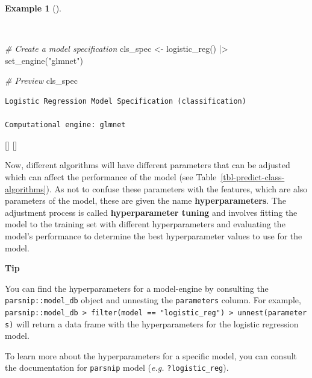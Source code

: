\documentclass[
  letterpaper,
  krantz1]{latex/krantz-mod}
\newenvironment{Shaded}{\begin{snugshade}}{\end{snugshade}}
\newcommand{\CommentTok}[1]{\textcolor[rgb]{0.00,0.00,0.00}{\textit{#1}}}
\newcommand{\FunctionTok}[1]{\textcolor[rgb]{0.00,0.00,0.00}{#1}}
\newcommand{\NormalTok}[1]{\textcolor[rgb]{0.00,0.00,0.00}{#1}}
\newcommand{\OtherTok}[1]{\textcolor[rgb]{0.00,0.00,0.00}{#1}}
\newcommand{\SpecialCharTok}[1]{\textcolor[rgb]{0.00,0.00,0.00}{#1}}
\newcommand{\StringTok}[1]{\textcolor[rgb]{0.00,0.00,0.00}{#1}}
\newcommand{\cindex}[1]{%
  \StrSubstitute{#1}{_}{\_}[\temp]%
  \index{\temp}%
}
\theoremstyle{definition}
\theoremstyle{definition}
\newtheorem{example}{Example}[chapter]
\theoremstyle{remark}
\begin{document}
\begin{example}[]\protect\hypertarget{exm-predict-class-model-spec}{}\label{exm-predict-class-model-spec}

~

\begin{Shaded}
\begin{Highlighting}[numbers=left,,]
\CommentTok{\# Create a model specification}
\NormalTok{cls\_spec }\OtherTok{\textless{}{-}}
  \FunctionTok{logistic\_reg}\NormalTok{() }\SpecialCharTok{|\textgreater{}}
  \FunctionTok{set\_engine}\NormalTok{(}\StringTok{"glmnet"}\NormalTok{)}

\CommentTok{\# Preview}
\NormalTok{cls\_spec}
\end{Highlighting}
\end{Shaded}

\begin{verbatim}
Logistic Regression Model Specification (classification)

Computational engine: glmnet
\end{verbatim}

\cindex{logistic_reg()}\cindex{set_engine()}

\end{example}

Now, different algorithms will have different parameters that can be
adjusted which can affect the performance of the model (see
Table~\ref{tbl-predict-class-algorithms}). As not to confuse these
parameters with the features, which are also parameters of the model,
these are given the name
\textbf{hyperparameters}. The adjustment process
is called \textbf{hyperparameter tuning}
and involves fitting the model to the training set with different
hyperparameters and evaluating the model's performance to determine the
best hyperparameter values to use for the model.

\pagebreak

\begin{tcolorbox}[enhanced jigsaw, toprule=.15mm, breakable, colback=white, arc=.35mm, left=2mm, colframe=quarto-callout-color-frame, opacityback=0, bottomrule=.15mm, rightrule=.15mm, leftrule=.75mm]

\textbf{ Tip}

You can find the hyperparameters for a model-engine by consulting the
\texttt{parsnip::model\_db} object and unnesting the \texttt{parameters}
column. For example,
\texttt{parsnip::model\_db\ \textbar{}\textgreater{}\ filter(model\ ==\ "logistic\_reg")\ \textbar{}\textgreater{}\ unnest(parameters)}
will return a data frame with the hyperparameters for the logistic
regression model.

To learn more about the hyperparameters for a specific model, you can
consult the documentation for \texttt{parsnip} model (\emph{e.g.}
\texttt{?logistic\_reg}).

\end{tcolorbox}
\end{document}
